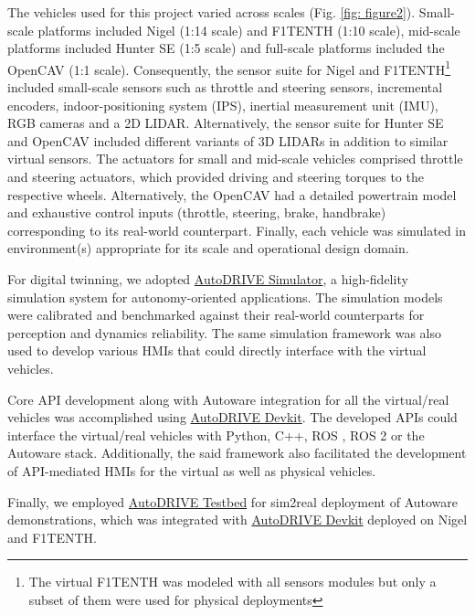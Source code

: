 The vehicles used for this project varied across scales (Fig. \ref{fig: figure2}). Small-scale platforms included Nigel (1:14 scale) and F1TENTH (1:10 scale), mid-scale platforms included Hunter SE (1:5 scale) and full-scale platforms included the OpenCAV (1:1 scale). Consequently, the sensor suite for Nigel and F1TENTH\footnote{The virtual F1TENTH was modeled with all sensors modules but only a subset of them were used for physical deployments} included small-scale sensors such as throttle and steering sensors, incremental encoders, indoor-positioning system (IPS), inertial measurement unit (IMU), RGB cameras and a 2D LIDAR. Alternatively, the sensor suite for Hunter SE and OpenCAV included different variants of 3D LIDARs in addition to similar virtual sensors. The actuators for small and mid-scale vehicles comprised throttle and steering actuators, which provided driving and steering torques to the respective wheels. Alternatively, the OpenCAV had a detailed powertrain model and exhaustive control inputs (throttle, steering, brake, handbrake) corresponding to its real-world counterpart. Finally, each vehicle was simulated in environment(s) appropriate for its scale and operational design domain.

For digital twinning, we adopted \href{https://github.com/Tinker-Twins/AutoDRIVE/tree/AutoDRIVE-Simulator}{AutoDRIVE Simulator}, a high-fidelity simulation system for autonomy-oriented applications. The simulation models were calibrated and benchmarked against their real-world counterparts for perception and dynamics reliability. The same simulation framework was also used to develop various HMIs that could directly interface with the virtual vehicles.

Core API development along with Autoware integration for all the virtual/real vehicles was accomplished using \href{https://github.com/Tinker-Twins/AutoDRIVE/tree/AutoDRIVE-Devkit}{AutoDRIVE Devkit}. The developed APIs could interface the virtual/real vehicles with Python, C++, ROS \cite{ROS1}, ROS 2 \cite{ROS2} or the Autoware stack. Additionally, the said framework also facilitated the development of API-mediated HMIs for the virtual as well as physical vehicles. 

Finally, we employed \href{https://github.com/Tinker-Twins/AutoDRIVE/tree/AutoDRIVE-Testbed}{AutoDRIVE Testbed} for sim2real deployment of Autoware demonstrations, which was integrated with \href{https://github.com/Tinker-Twins/AutoDRIVE/tree/AutoDRIVE-Devkit}{AutoDRIVE Devkit} deployed on Nigel and F1TENTH.

